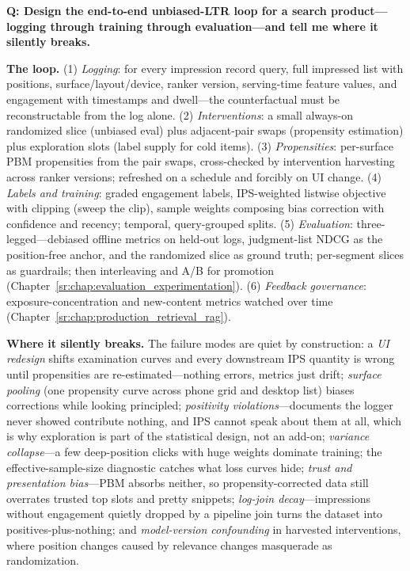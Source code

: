 \begin{interviewq}
\textbf{Q: Design the end-to-end unbiased-LTR loop for a search product---logging through training through evaluation---and tell me where it silently breaks.}

 \quad {} \quad \badgefreq{\freqmed}

\stronganswer

\textbf{The loop.} (1) \textit{Logging}: for every impression record query, full impressed list with positions, surface/layout/device, ranker version, serving-time feature values, and engagement with timestamps and dwell---the counterfactual must be reconstructable from the log alone. (2) \textit{Interventions}: a small always-on randomized slice (unbiased eval) plus adjacent-pair swaps (propensity estimation) plus exploration slots (label supply for cold items). (3) \textit{Propensities}: per-surface PBM propensities from the pair swaps, cross-checked by intervention harvesting across ranker versions; refreshed on a schedule and forcibly on UI change. (4) \textit{Labels and training}: graded engagement labels, IPS-weighted listwise objective with clipping (sweep the clip), sample weights composing bias correction with confidence and recency; temporal, query-grouped splits. (5) \textit{Evaluation}: three-legged---debiased offline metrics on held-out logs, judgment-list NDCG as the position-free anchor, and the randomized slice as ground truth; per-segment slices as guardrails; then interleaving and A/B for promotion (Chapter~\ref{sr:chap:evaluation_experimentation}). (6) \textit{Feedback governance}: exposure-concentration and new-content metrics watched over time (Chapter~\ref{sr:chap:production_retrieval_rag}).

\textbf{Where it silently breaks.} The failure modes are quiet by construction: a \textit{UI redesign} shifts examination curves and every downstream IPS quantity is wrong until propensities are re-estimated---nothing errors, metrics just drift; \textit{surface pooling} (one propensity curve across phone grid and desktop list) biases corrections while looking principled; \textit{positivity violations}---documents the logger never showed contribute nothing, and IPS cannot speak about them at all, which is why exploration is part of the statistical design, not an add-on; \textit{variance collapse}---a few deep-position clicks with huge weights dominate training; the effective-sample-size diagnostic catches what loss curves hide; \textit{trust and presentation bias}---PBM absorbs neither, so propensity-corrected data still overrates trusted top slots and pretty snippets; \textit{log-join decay}---impressions without engagement quietly dropped by a pipeline join turns the dataset into positives-plus-nothing; and \textit{model-version confounding} in harvested interventions, where position changes caused by relevance changes masquerade as randomization.


\end{interviewq}
